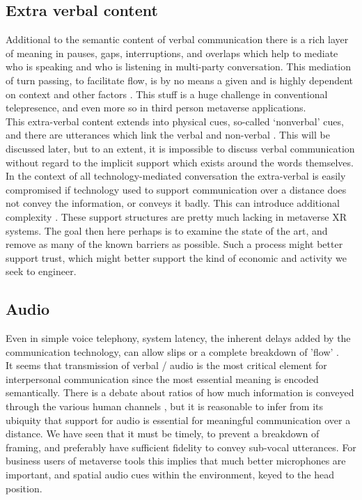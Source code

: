 \subsection{Extra verbal content}
Additional to the semantic content of verbal communication there is a rich layer of meaning in pauses, gaps, interruptions, and overlaps \cite{Heldner2010} which help to mediate who is speaking and who is listening in multi-party conversation. This mediation of turn passing, to facilitate flow, is by no means a given and is highly dependent on context and other factors \cite{Kleinke1986a}. This stuff is a huge challenge in conventional telepresence, and even more so in third person metaverse applications. \\ 
This extra-verbal content \cite{ting2012understanding} extends into physical cues, so-called `nonverbal' cues, and there are utterances which link the verbal and non-verbal \cite{Otsuka2005}. This will be discussed later, but to an extent, it is impossible to discuss verbal communication without regard to the implicit support which exists around the words themselves. \\
In the context of all technology-mediated conversation the extra-verbal is easily compromised if technology used to support communication over a distance does not convey the information, or conveys it badly. This can introduce additional complexity \cite{Otsuka2005}. These support structures are pretty much lacking in metaverse XR systems. The goal then here perhaps is to examine the state of the art, and remove as many of the known barriers as possible. Such a process might better support trust, which might better support the kind of economic and activity we seek to engineer.\\
\subsection{Audio}
Even in simple voice telephony, system latency, the inherent delays added by the communication technology, can allow slips or a complete breakdown of 'flow' \cite{Katagiri2007}.\\
It seems that transmission of verbal / audio is the most critical element for interpersonal communication since the most essential meaning is encoded semantically. There is a debate about ratios of how much information is conveyed through the various human channels \cite{loomis2012sensory}, but it is reasonable to infer from its ubiquity that support for audio is essential for meaningful communication over a distance. We have seen that it must be timely, to prevent a breakdown of framing, and preferably have sufficient fidelity to convey sub-vocal utterances. For business users of metaverse tools this implies that much better microphones are important, and spatial audio cues within the environment, keyed to the head position. \\
